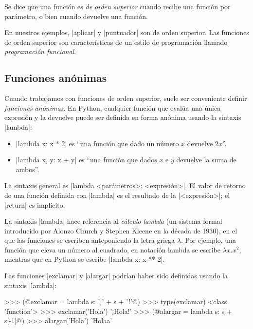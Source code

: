\begin{subappendices}
\begin{observacion}
Se dice que una función es \emph{de orden superior} cuando recibe una función
por parámetro, o bien cuando devuelve una función.
\end{observacion}

En nuestros ejemplos, |aplicar| y
|puntuador| son de orden superior. Las funciones de orden superior son
características de un estilo de programación llamado \emph{programación
funcional}.

\subsection*{Funciones anónimas}

Cuando trabajamos con funciones de orden superior, suele ser conveniente
definir \emph{funciones anónimas}. En Python, cualquier función que evalúa
una única expresión y la devuelve puede ser definida en forma anónima usando
la sintaxis |lambda|:

\begin{itemize}
\item |lambda x: x * 2| es ``una función que dado un número $x$ devuelve $2x$''.
\item |lambda x, y: x + y| es ``una función que dados $x$ e $y$ devuelve la suma de ambos''.
\end{itemize}

La sintaxis general es |lambda <parámetros>: <expresión>|. El valor de retorno de una
función definida con |lambda| es el resultado de la |<expresión>|; el |return| es
implícito.

\begin{sabias_que}
La sintaxis |lambda| hace referencia al \emph{cálculo lambda} (un sistema
formal introducido por Alonzo Church y Stephen Kleene en la década de 1930),
en el que las funciones se escriben anteponiendo la letra griega $\lambda$. Por
ejemplo, una función que eleva un número al cuadrado, en notación lambda se escribe
$\lambda x. x^2$, mientras que en Python se escribe |lambda x: x ** 2|.
\end{sabias_que}

Las funciones |exclamar| y |alargar| podrían haber sido definidas usando la
sintaxis |lambda|:

\begin{codigo-python-sn}
>>> (@exclamar = lambda s: '¡' + s + '!'@)
>>> type(exclamar)
<class 'function'>
>>> exclamar('Hola')
'¡Hola!'
>>> (@alargar = lambda s: s + s[-1]@)
>>> alargar('Hola')
'Holaa'
\end{codigo-python-sn}


\end{subappendices}
